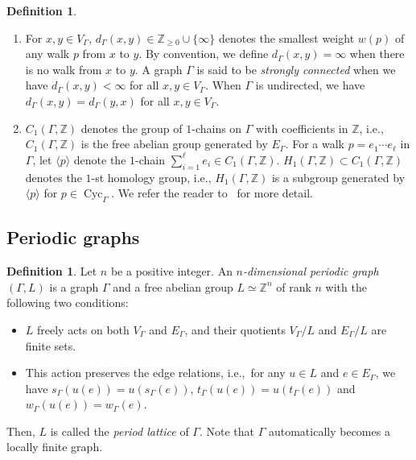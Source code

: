 \documentclass[10pt,a4paper]{amsart}
\theoremstyle{plain}
\theoremstyle{definition}
\newtheorem{defi}[cdrthm]{Definition}
\theoremstyle{remark}
\begin{document}
\begin{defi}
\begin{enumerate}
\item 
For $x, y \in V_{\Gamma}$, $d_{\Gamma}(x, y) \in \mathbb{Z}_{\ge 0} \cup \{ \infty \}$ denotes the smallest weight $w(p)$ of any walk $p$ from $x$ to $y$. 
By convention, we define $d_{\Gamma}(x, y) = \infty$ when there is no walk from $x$ to $y$. 
A graph $\Gamma$ is said to be \textit{strongly connected} 
when we have $d_{\Gamma}(x, y) < \infty$ for all $x, y \in V_{\Gamma}$. 
When $\Gamma$ is undirected, we have $d_{\Gamma}(x,y) = d_{\Gamma}(y,x)$ for all $x,y \in V_{\Gamma}$. 

\item 
$C_1(\Gamma, \mathbb{Z})$ denotes the group of $1$-chains on $\Gamma$ with coefficients in $\mathbb{Z}$, i.e., 
$C_1(\Gamma, \mathbb{Z})$ is the free abelian group generated by $E_{\Gamma}$. 
For a walk $p = e_1 \cdots e_{\ell}$ in $\Gamma$, let $\langle p \rangle$ denote the $1$-chain 
$\sum _{i = 1} ^{\ell} e_i \in C_1(\Gamma, \mathbb{Z})$. 
$H_1(\Gamma, \mathbb{Z}) \subset C_1(\Gamma, \mathbb{Z})$ denotes the $1$-st homology group, i.e., 
$H_1(\Gamma, \mathbb{Z})$ is a subgroup generated by $\langle p \rangle$ for $p \in \operatorname{Cyc}_{\Gamma}$. 
We refer the reader to~\cite{Sunada} for more detail. 
\end{enumerate}
\end{defi}

\setcounter{subsection}{2}
\subsection{Periodic graphs}

\begin{defi}\label{defi:pg}
Let $n$ be a positive integer. 
An \textit{$n$-dimensional periodic graph} $(\Gamma, L)$ is a graph $\Gamma$ and 
a free abelian group $L \simeq \mathbb{Z}^n$ of rank $n$ with the following two conditions:
\begin{itemize}
\item $L$ freely acts on both $V_\Gamma$ and $E_\Gamma$, 
and their quotients $V_\Gamma / L$ and $E_\Gamma / L$ are finite sets. 
\item This action preserves the edge relations, i.e.,\ for any $u \in L$ and $e \in E_\Gamma$, 
we have $s_\Gamma(u(e))=u(s_\Gamma(e))$, $t_\Gamma(u(e))=u(t_\Gamma(e))$ and 
$w_{\Gamma}(u(e))=w_{\Gamma}(e)$.
\end{itemize}
Then, $L$ is called the \textit{period lattice} of $\Gamma$. 
Note that $\Gamma$ automatically becomes a locally finite graph. 
\end{defi}
\end{document}
